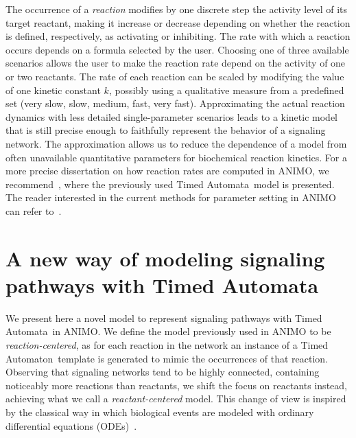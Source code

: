\documentclass{llncs}
\newcommand{\ta}{Timed Automaton}
\newcommand{\tas}{Timed Automata}
\begin{document}
The occurrence of a \emph{reaction} modifies by one discrete step the activity level of its target reactant, making it increase or decrease 
depending on whether the reaction is defined, respectively, as activating or inhibiting.
The rate with which a reaction occurs depends on a formula selected by the user. 
Choosing one of three available scenarios allows the user to make the reaction rate depend on
the activity of one or two reactants.
The rate of each reaction can be scaled by modifying the value of one kinetic constant $k$,
possibly using a qualitative measure from a predefined set ({\sf very slow}, {\sf slow},
{\sf medium}, {\sf fast}, {\sf very fast}).
Approximating the actual reaction dynamics with less detailed single-parameter scenarios
leads to a kinetic model that is still precise enough to faithfully represent the behavior of a signaling network.
The approximation allows us to reduce the dependence of a model from often unavailable quantitative
parameters for biochemical reaction kinetics.
For a more precise dissertation on how reaction rates are computed in ANIMO, we recommend~\cite{animo-ieee},
where the previously used \tas\ model is presented. The reader interested in the current
methods for parameter setting in ANIMO can refer to~\cite{animo-syncop}.




\section{A new way of modeling signaling pathways with \tas}\label{sec:animo-new}
We present here a novel model to represent signaling pathways with \tas\ in ANIMO.
We define the model previously used in ANIMO to be \emph{reaction-centered}, as for each reaction
in the network an instance of a \ta\ template is generated to mimic
the occurrences of that reaction. Observing that signaling
networks tend to be highly connected, containing noticeably more reactions than reactants,
we shift the focus on reactants instead, achieving what we call a \emph{reactant-centered} model.
This change of view is inspired by the classical way in which biological events are modeled
with ordinary differential equations (ODEs)~\cite{ode-ma-anche-altro}.

\end{document}

